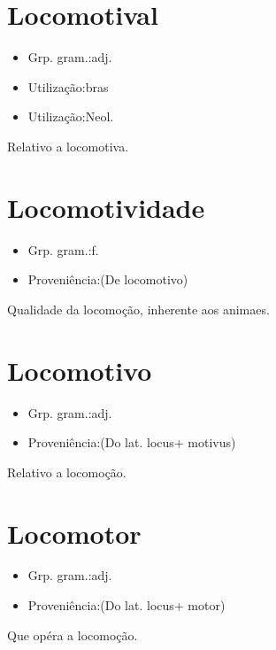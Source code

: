 \section{Locomotival}
\begin{itemize}
\item {Grp. gram.:adj.}
\end{itemize}
\begin{itemize}
\item {Utilização:bras}
\end{itemize}
\begin{itemize}
\item {Utilização:Neol.}
\end{itemize}
Relativo a locomotiva.
\section{Locomotividade}
\begin{itemize}
\item {Grp. gram.:f.}
\end{itemize}
\begin{itemize}
\item {Proveniência:(De \textunderscore locomotivo\textunderscore )}
\end{itemize}
Qualidade da locomoção, inherente aos animaes.
\section{Locomotivo}
\begin{itemize}
\item {Grp. gram.:adj.}
\end{itemize}
\begin{itemize}
\item {Proveniência:(Do lat. \textunderscore locus\textunderscore  + \textunderscore motivus\textunderscore )}
\end{itemize}
Relativo a locomoção.
\section{Locomotor}
\begin{itemize}
\item {Grp. gram.:adj.}
\end{itemize}
\begin{itemize}
\item {Proveniência:(Do lat. \textunderscore locus\textunderscore  + \textunderscore motor\textunderscore )}
\end{itemize}
Que opéra a locomoção.
